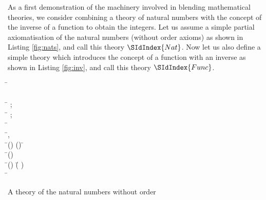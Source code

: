 As a first demonstration of the machinery involved in blending
mathematical theories, we consider combining a theory of natural
numbers with the concept of the inverse of a function to obtain the
integers. Let us assume a simple partial axiomatisation of the natural
numbers (without order axioms) as shown in Listing \ref{fig:nats}, and
call this theory $\SIdIndex{Nat}$. Now let us also define a simple theory
which introduces the concept of a function with an inverse as shown in
Listing \ref{fig:inv}, and call this theory $\SIdIndex{Func}$. 
\begin{listing}[!ht]
\begin{mdframed}
\begin{hetcasl}
\SPEC \= \Ax{=}\\
\> \SORT {}\\
\> \OPS \= \Ax{:} ;\\
\>\>  \Ax{:} \= \Ax{\rightarrow} ;\\
\>\> \Ax{\_\_}\Ax{+}\Ax{\_\_} \Ax{:} \= \Ax{\times}  \Ax{\rightarrow} \\
\> \Ax{\forall} \=,  \Ax{:}  \\
\> \Ax{\bullet} \=() \Ax{=} () \Ax{\Rightarrow} \= \Ax{=} \\
\> \Ax{\bullet} \Ax{\neg} \=() \Ax{=} \\
\> \Ax{\bullet} \=() \Ax{+}  \Ax{=} (\= \Ax{+} )\\
\> \Ax{\bullet} \= \Ax{+}  \Ax{=} \\
\end{hetcasl}
\end{mdframed}
\caption{A theory of the natural numbers without order}
\label{fig:nats}
\end{listing}

